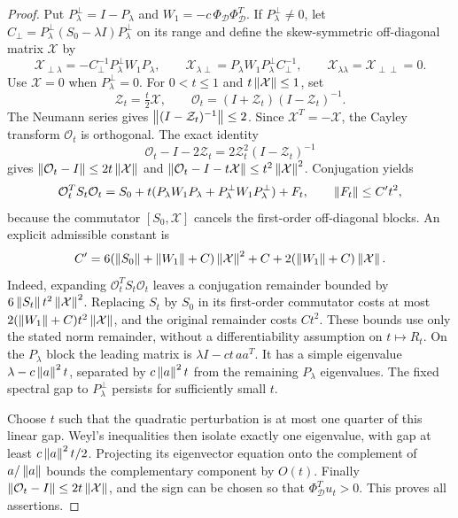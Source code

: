 \begin{proof}
Put \(P_\lambda^\perp=I-P_\lambda\) and \(W_1=-c\,\Phi_{\mathcal D}\Phi_{\mathcal D}^T\).
If \(P_\lambda^\perp\ne0\), let
\(C_\perp=P_\lambda^\perp(S_0-\lambda I)P_\lambda^\perp\) on its range and define the
skew-symmetric off-diagonal matrix \(\mathcal X\) by
\[
 \mathcal X_{\perp\lambda}=-C_\perp^{-1}P_\lambda^\perp W_1P_\lambda,\qquad
 \mathcal X_{\lambda\perp}=P_\lambda W_1P_\lambda^\perp C_\perp^{-1},\qquad
 \mathcal X_{\lambda\lambda}=\mathcal X_{\perp\perp}=0.
\]
Use \(\mathcal X=0\) when \(P_\lambda^\perp=0\).
For \(0<t\le1\) and \(t\left\lVert \mathcal X\right\rVert\le1\), set
\[
 \mathcal Z_t=\tfrac{t}{2}\mathcal X,\qquad
 \mathcal O_t=(I+\mathcal Z_t)(I-\mathcal Z_t)^{-1}.
\]
The Neumann series gives \(\left\lVert (I-\mathcal Z_t)^{-1}\right\rVert\le2\).
Since \(\mathcal X^T=-\mathcal X\), the Cayley transform \(\mathcal O_t\) is orthogonal.
The exact identity
\[
 \mathcal O_t-I-2\mathcal Z_t
 =2\mathcal Z_t^2(I-\mathcal Z_t)^{-1}
\]
gives \(\left\lVert \mathcal O_t-I\right\rVert\le2t\left\lVert \mathcal X\right\rVert\) and
\(\left\lVert \mathcal O_t-I-t\mathcal X\right\rVert\le t^2\left\lVert \mathcal X\right\rVert^2\).
Conjugation yields
\[
 \mathcal O_t^TS_t\mathcal O_t
  =S_0+t(P_\lambda W_1P_\lambda+P_\lambda^\perp W_1P_\lambda^\perp)+F_t,
 \qquad \left\lVert F_t\right\rVert\le C't^2,
\]
because the commutator \([S_0,\mathcal X]\) cancels the first-order
off-diagonal blocks. An explicit admissible constant is
\[
 C'=6(\left\lVert S_0\right\rVert+\left\lVert W_1\right\rVert+C)\left\lVert \mathcal X\right\rVert^2
       +C+2(\left\lVert W_1\right\rVert+C)\left\lVert \mathcal X\right\rVert .
\]
Indeed, expanding \(\mathcal O_t^TS_t\mathcal O_t\) leaves a conjugation
remainder bounded by \(6\left\lVert S_t\right\rVert t^2\left\lVert \mathcal X\right\rVert^2\).
Replacing \(S_t\) by \(S_0\) in its first-order commutator costs
at most \(2(\left\lVert W_1\right\rVert+C)t^2\left\lVert \mathcal X\right\rVert\), and the original remainder
costs \(Ct^2\). These bounds use only the stated norm remainder,
without a differentiability assumption on \(t\mapsto R_t\).
On the \(P_\lambda\) block the leading matrix is
\(\lambda I-ct\,aa^T\). It has a simple eigenvalue
\(\lambda-c\left\lVert a\right\rVert^2t\), separated by
\(c\left\lVert a\right\rVert^2t\) from the remaining \(P_\lambda\) eigenvalues.
The fixed spectral gap to \(P_\lambda^\perp\) persists for sufficiently small
\(t\).

Choose \(t\) such that the quadratic perturbation is at most one
quarter of this linear gap. Weyl's inequalities then isolate exactly one
eigenvalue, with gap at least \(c\left\lVert a\right\rVert^2t/2\). Projecting its
eigenvector equation onto the complement of \(a/\left\lVert a\right\rVert\) bounds the
complementary component by \(O(t)\). Finally
\(\left\lVert \mathcal O_t-I\right\rVert\le2t\left\lVert \mathcal X\right\rVert\), and the sign can be chosen so that
\(\Phi_{\mathcal D}^Tu_t>0\). This proves all assertions.
\end{proof}

